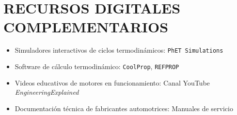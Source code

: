 \documentclass{article}
\begin{document}
\vspace{5mm}

\section*{RECURSOS DIGITALES COMPLEMENTARIOS}

\begin{itemize}
    \item Simuladores interactivos de ciclos termodinámicos: \texttt{PhET Simulations}
    \item Software de cálculo termodinámico: \texttt{CoolProp}, \texttt{REFPROP}
    \item Videos educativos de motores en funcionamiento: Canal YouTube \textit{EngineeringExplained}
    \item Documentación técnica de fabricantes automotrices: Manuales de servicio
\end{itemize}
\end{document}
